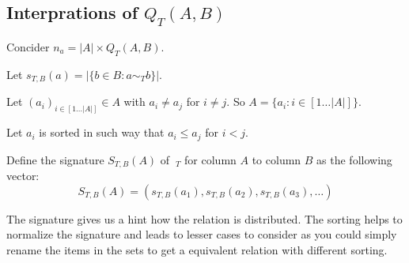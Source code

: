 \subsection{Interprations of $Q_T(A,B)$}\label{ch:interpretation}
Concider $n_a = |A| \times Q_T(A,B)$. 

\begin{definition}[Signature $S_{T,B}(A)$]
  Let $s_{T,B}(a) = |\{ b \in B : a \sim_T b \}|$.

  Let $(a_i)_{i \in [1 \ldots |A|]} \in A$ with $a_i \neq a_j$ for $i \neq j$.
  So $A = \{ a_i : i \in [1 \ldots |A|] \}$.

  Let $a_i$ is sorted in such way that $a_i \leq a_j$ for $i < j$.

  Define the signature $S_{T,B}(A)$ of $~_T$ for column $A$ to column $B$ as the following vector:
  \begin{equation}
    S_{T,B}(A) = (s_{T,B}(a_1), s_{T,B}(a_2), s_{T,B}(a_3), \ldots )
  \end{equation}
\end{definition}

The signature gives us a hint how the relation is distributed.
The sorting helps to normalize the signature and leads to lesser cases to consider as you could simply rename the items in the sets to get a equivalent relation with different sorting.

